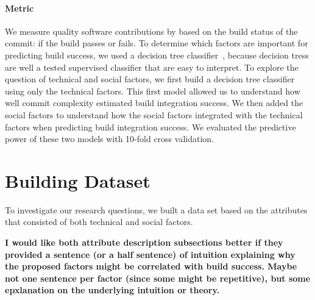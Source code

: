 \documentclass[10pt, conference]{IEEEtran}
\newcommand{\todo}[1]
  {{\scriptsize \textbf{\color{red} {#1}}}}
\begin{document}
\paragraph{Metric}
We measure quality software contributions by based on the build status of the
commit: if the build passes or fails.
To determine which factors are important for predicting build success, we used
a decision tree classifier~\cite{Quinlan86}, because decision tress are well a 
tested supervised classifier that are easy to interpret.
To explore the question of technical and social factors, we first build a
decision tree classifier using only the technical factors.  This first model
allowed us to understand how well commit complexity estimated build integration
success.  We then added the social factors to understand how the social factors
integrated with the technical factors when predicting build integration success.
We evaluated the predictive power of these two 
models with 10-fold cross validation.
\section{Building Dataset}
\label{approach}

To investigate our research questions, we built a data set based on the 
attributes that consisted of both technical and social factors. 

\todo{I would like both attribute description subsections better if they
  provided a sentence (or a half sentence) of intuition explaining why the
  proposed factors might be correlated with build success.  Maybe not one
  sentence per factor (since some might be repetitive), but some epxlanation on
  the underlying intuition or theory.}
\end{document}
